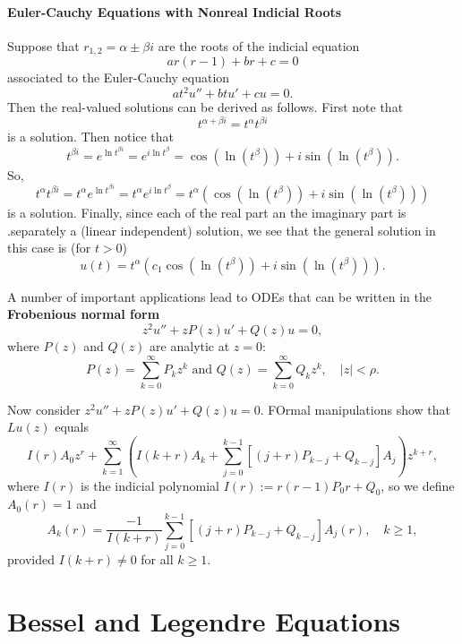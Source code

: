 
\paragraph{Euler-Cauchy Equations with Nonreal Indicial Roots}
Suppose that \(r_{1,2} = \alpha \pm \beta i\) are the roots of the indicial equation
\[ar(r - 1) + br + c = 0\]
associated to the Euler-Cauchy equation
\[at^2u'' + btu' + cu = 0.\]
Then the real-valued solutions can be derived as follows. First note that
\[t^{\alpha + \beta i} = t^\alpha t^{\beta i}\]
is a solution. Then notice that
\[t^{\beta i} = e^{\ln t^{\beta i}} = e^{i \ln t^\beta} = \cos(\ln(t^\beta)) + i\sin(\ln(t^\beta)).\]
So,
\[t^\alpha t^{\beta i} = t^{\alpha} e^{\ln t^{\beta i}} = t^\alpha e^{i \ln t^\beta} = t^\alpha \left(\cos(\ln(t^\beta)) + i\sin(\ln(t^\beta))\right)\]
is a solution. Finally, since each of the real part an the imaginary part is .separately a (linear independent) solution, we see that the general solution in this case is (for \(t > 0\))
\[u(t) = t^{\alpha}\left(c_1 \cos(\ln(t^\beta)) + i\sin(\ln(t^\beta))\right).\]


\bigskip
A number of important applications lead to ODEs that can be written in the \textbf{Frobenious normal form}
\[z^2u'' + zP(z)u' + Q(z)u = 0,\]
where \(P(z)\) and \(Q(z)\) are analytic at \(z = 0\):
\[P(z) = \sum_{k=0}^{\infty}P_k z^k \text{ and } Q(z) = \sum_{k=0}^{\infty}Q_k z^k, \quad |z| < \rho.\]

Now consider \(z^2u'' + zP(z) u' + Q(z)u = 0\). FOrmal manipulations show that \(Lu(z)\) equals
\[I(r)A_0 z^r + \sum_{k=1}^{\infty}\left(I(k + r) A_k + \sum_{j=0}^{k-1} \left[(j + r)P_{k - j} + Q_{k - j} \right]A_j \right)z^{k + r},\]
where \(I(r)\) is the indicial polynomial \(I(r) := r(r - 1)P_0 r + Q_0\), so we define \(A_0(r) = 1\) and
\[A_k(r) = \frac{-1}{I(k + r)} \sum_{j=0}^{k-1}[(j + r)P_{k-j} + Q_{k - j}]A_j(r), \quad k \geq 1,\]
provided \(I(k + r) \neq 0\) for all \(k \geq 1\).

\section{Bessel and Legendre Equations}

